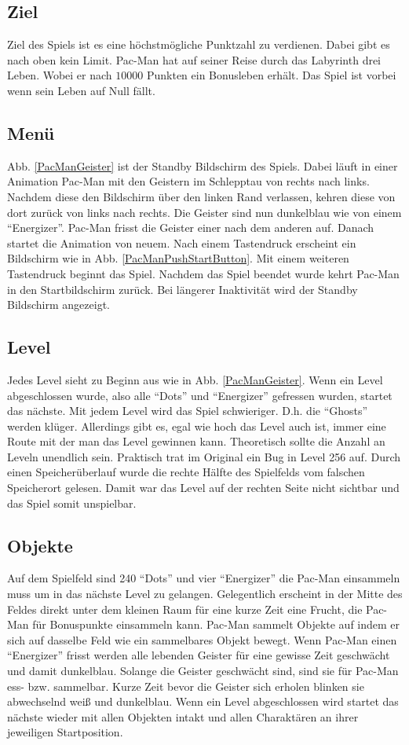 \documentclass[a4paper, 11pt]{article}
\begin{document}
\subsection{Ziel}
Ziel des Spiels ist es eine höchstmögliche Punktzahl zu verdienen. Dabei gibt es nach oben kein Limit. Pac-Man hat auf seiner Reise durch das Labyrinth drei Leben. Wobei er nach $10000$ Punkten ein Bonusleben erhält. Das Spiel ist vorbei wenn sein Leben auf Null fällt.  

\subsection{Menü}
Abb. \ref{PacManGeister} ist der Standby Bildschirm des Spiels. Dabei läuft in einer Animation Pac-Man mit den Geistern im Schlepptau von rechts nach links. Nachdem diese den Bildschirm über den linken Rand verlassen, kehren diese von dort zurück von links nach rechts. Die Geister sind nun dunkelblau wie von einem "`Energizer"'. Pac-Man frisst die Geister einer nach dem anderen auf. Danach startet die Animation von neuem. 
Nach einem Tastendruck erscheint ein Bildschirm wie in Abb. \ref{PacManPushStartButton}. Mit einem weiteren Tastendruck beginnt das Spiel. Nachdem das Spiel beendet wurde kehrt Pac-Man in den Startbildschirm zurück. Bei längerer Inaktivität wird der Standby Bildschirm angezeigt.

\subsection{Level}
Jedes Level sieht zu Beginn aus wie in Abb. \ref{PacManGeister}. Wenn ein Level abgeschlossen wurde, also alle "`Dots"' und "`Energizer"' gefressen wurden, startet das nächste. Mit jedem Level wird das Spiel schwieriger. D.h. die "`Ghosts"' werden klüger. Allerdings gibt es, egal wie hoch das Level auch ist, immer eine Route mit der man das Level gewinnen kann. Theoretisch sollte die Anzahl an Leveln unendlich sein. Praktisch trat im Original ein Bug in Level 256 auf. Durch einen Speicherüberlauf wurde die rechte Hälfte des Spielfelds vom falschen Speicherort gelesen. Damit war das Level auf der rechten Seite nicht sichtbar und das Spiel somit unspielbar.

\subsection{Objekte}
Auf dem Spielfeld sind 240 "`Dots"' und vier "`Energizer"' die Pac-Man einsammeln muss um in das nächste Level zu gelangen. Gelegentlich erscheint in der Mitte des Feldes direkt unter dem kleinen Raum für eine kurze Zeit eine Frucht, die Pac-Man für Bonuspunkte einsammeln kann. Pac-Man sammelt Objekte auf indem er sich auf dasselbe Feld wie ein sammelbares Objekt bewegt. Wenn Pac-Man einen "`Energizer"' frisst werden alle lebenden Geister für eine gewisse Zeit geschwächt und damit dunkelblau. Solange die Geister geschwächt sind, sind sie für Pac-Man ess- bzw. sammelbar. Kurze Zeit bevor die Geister sich erholen blinken sie abwechselnd weiß und dunkelblau. Wenn ein Level abgeschlossen wird startet das nächste wieder mit allen Objekten intakt und allen Charaktären an ihrer jeweiligen Startposition.
\end{document}
